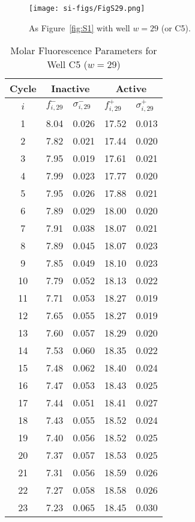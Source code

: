                 \begin{figure}
                    \centering
                    \texttt{[image: si-figs/FigS29.png]}
                    \caption{
                        As Figure~\ref{fig:S1} with well $w=29$ (or C5).
                    }
                \end{figure}
                \clearpage
    \begin{table}
        \caption{Molar Fluorescence Parameters for Well C5 ($w=29$)}
        \centering
        \begin{tabular}{c|ll|ll}
            Cycle & \multicolumn{2}{c|}{Inactive} & \multicolumn{2}{c}{Active} \\
            \hline
            $i$ & $f_{i,29}^{-}$ & $\sigma_{i,29}^{-}$ &  $f_{i,29}^{+}$ & $\sigma_{i,29}^{+}$ \\
            \hline
    1 & 8.04 & 0.026 & 17.52 & 0.013 \\
2 & 7.82 & 0.021 & 17.44 & 0.020 \\
3 & 7.95 & 0.019 & 17.61 & 0.021 \\
4 & 7.99 & 0.023 & 17.77 & 0.020 \\
5 & 7.95 & 0.026 & 17.88 & 0.021 \\
6 & 7.89 & 0.029 & 18.00 & 0.020 \\
7 & 7.91 & 0.038 & 18.07 & 0.021 \\
8 & 7.89 & 0.045 & 18.07 & 0.023 \\
9 & 7.85 & 0.049 & 18.10 & 0.023 \\
10 & 7.79 & 0.052 & 18.13 & 0.022 \\
11 & 7.71 & 0.053 & 18.27 & 0.019 \\
12 & 7.65 & 0.055 & 18.27 & 0.019 \\
13 & 7.60 & 0.057 & 18.29 & 0.020 \\
14 & 7.53 & 0.060 & 18.35 & 0.022 \\
15 & 7.48 & 0.062 & 18.40 & 0.024 \\
16 & 7.47 & 0.053 & 18.43 & 0.025 \\
17 & 7.44 & 0.051 & 18.41 & 0.027 \\
18 & 7.43 & 0.055 & 18.52 & 0.024 \\
19 & 7.40 & 0.056 & 18.52 & 0.025 \\
20 & 7.37 & 0.057 & 18.53 & 0.025 \\
21 & 7.31 & 0.056 & 18.59 & 0.026 \\
22 & 7.27 & 0.058 & 18.58 & 0.026 \\
23 & 7.23 & 0.065 & 18.45 & 0.030 \\

\end{tabular}
\end{table}
